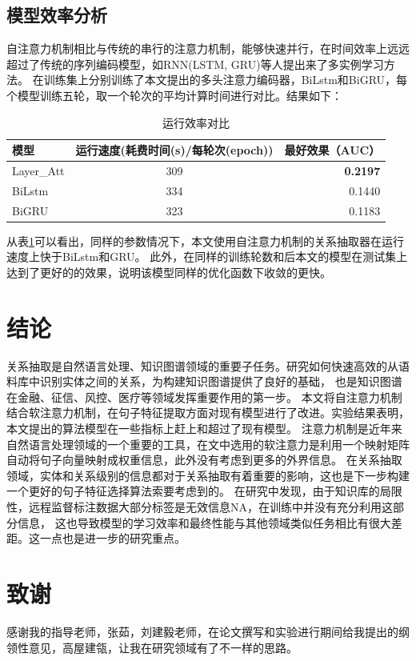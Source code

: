 \documentclass[UTF8]{csoarticle}
\begin{document}
\subsection{模型效率分析}
自注意力机制相比与传统的串行的注意力机制，能够快速并行，在时间效率上远远超过了传统的序列编码模型，如RNN(LSTM, GRU)等人提出来了多实例学习方法。
在训练集上分别训练了本文提出的多头注意力编码器，BiLstm和BiGRU，每个模型训练五轮，取一个轮次的平均计算时间进行对比。结果如下：

\begin{table}
    \caption{运行效率对比}
    \label{tab:tab2}
    \centering
    \begin{tabular}{|l|c|r|}
        \hline
        模型 & 运行速度(耗费时间(s)/每轮次(epoch)) & 最好效果（AUC）\\
        \hline  
        Layer\_Att &309 & \textbf{0.2197}  \\
        BiLstm & 334& 0.1440\\
        BiGRU & 323& 0.1183\\
        \end{tabular}
\end{table}

从表\ref{tab:tab2}可以看出，同样的参数情况下，本文使用自注意力机制的关系抽取器在运行速度上快于BiLstm和GRU。
此外，在同样的训练轮数和后本文的模型在测试集上达到了更好的的效果，说明该模型同样的优化函数下收敛的更快。

\section{结论}
关系抽取是自然语言处理、知识图谱领域的重要子任务。研究如何快速高效的从语料库中识别实体之间的关系，为构建知识图谱提供了良好的基础，
也是知识图谱在金融、征信、风控、医疗等领域发挥重要作用的第一步。
本文将自注意力机制结合软注意力机制，在句子特征提取方面对现有模型进行了改进。实验结果表明，本文提出的算法模型在一些指标上赶上和超过了现有模型。
注意力机制是近年来自然语言处理领域的一个重要的工具，在文中选用的软注意力是利用一个映射矩阵自动将句子向量映射成权重信息，此外没有考虑到更多的外界信息。
在关系抽取领域，实体和关系级别的信息都对于关系抽取有着重要的影响，这也是下一步构建一个更好的句子特征选择算法索要考虑到的。
在研究中发现，由于知识库的局限性，远程监督标注数据大部分标签是无效信息NA，在训练中并没有充分利用这部分信息，
这也导致模型的学习效率和最终性能与其他领域类似任务相比有很大差距。这一点也是进一步的研究重点。
\section*{致谢}
感谢我的指导老师，张茹，刘建毅老师，在论文撰写和实验进行期间给我提出的纲领性意见，高屋建瓴，让我在研究领域有了不一样的思路。
\end{document}
